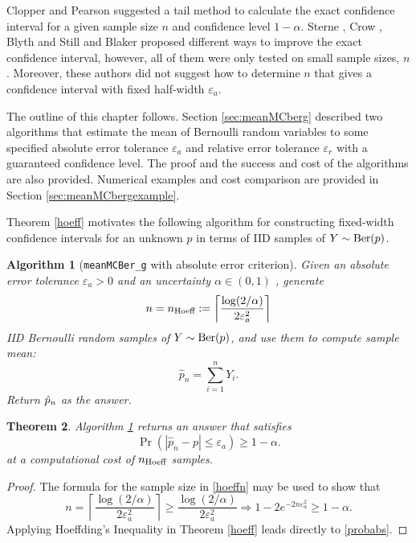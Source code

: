 \documentclass{iitthesis}
\newtheorem{theorem}{Theorem}[section]
\newtheorem{algorithm}[theorem]{Algorithm}
\theoremstyle{definition}
\begin{document}
Clopper and Pearson \cite{CP34} suggested a tail method to calculate the exact confidence interval for a given sample size $n$ and confidence level $1-\alpha$. Sterne \cite{sterne54}, Crow \cite{crow56}, Blyth and Still \cite{BS83} and Blaker \cite{Blaker00} proposed different ways to improve the exact confidence interval, however, all of them were only tested on small sample sizes, $n$.  Moreover, these authors did not suggest how to determine $n$ that gives a confidence interval with fixed half-width $\varepsilon_a$. 

The outline of this chapter follows. Section \ref{sec:meanMCberg} described two algorithms that estimate the mean of Bernoulli random variables to some specified absolute error tolerance $\varepsilon_a$ and relative error tolerance $\varepsilon_r$ with a guaranteed confidence level. The proof and the success and cost of the algorithms are also provided. Numerical examples and cost comparison are provided in Section \ref{sec:meanMCbergexample}. 

 \label{sec:meanMCberg}

Theorem \ref{hoeff} motivates the following algorithm for constructing fixed-width confidence intervals for an unknown $p$ in terms of IID samples of $Y\sim \operatorname{Ber}(p)$.
\begin{algorithm}[{\tt meanMCBer\_g} with absolute error criterion]\label{algabs}
Given an absolute error tolerance $\varepsilon_a > 0$ and an uncertainty $\alpha \in (0,1)$ , generate
\begin{equation}\label{hoeffn}
n = n_{\text{Hoeff}} := \left \lceil  \frac{\log(2/\alpha)}{2\varepsilon_a^2} \right \rceil
\end{equation}
IID Bernoulli random samples of $Y \sim \operatorname{Ber}(p)$, and use them to compute sample mean:
\begin{equation} \label{abserrp}
\hat{p}_n = \sum_{i =1}^n Y_i.
\end{equation}
Return $\hat{p}_n$ as the answer.
\end{algorithm}
\begin{theorem}
Algorithm \ref{algabs} returns an answer that satisfies 
\begin{equation}\label{probabs}
\Pr\left(|\hat{p}_n -p| \leq \varepsilon_a\right) \geq 1-\alpha.
\end{equation}
at a computational cost of $n_{\text{Hoeff}}$ samples.
\end{theorem}
\begin{proof}
The formula for the sample size in \eqref{hoeffn} may be used to show that
\begin{equation*}
n = \left \lceil \frac{\log(2/\alpha)}{2\varepsilon_a^2} \right \rceil \geq  \frac{\log(2/\alpha)}{2\varepsilon_a^2} \Rightarrow 
1- 2e^{-2n\varepsilon_a^2} \geq 1-\alpha.
\end{equation*}
Applying Hoeffding's Inequality in Theorem \ref{hoeff} leads directly to \eqref{probabs}. 
\end{proof}
\end{document}
